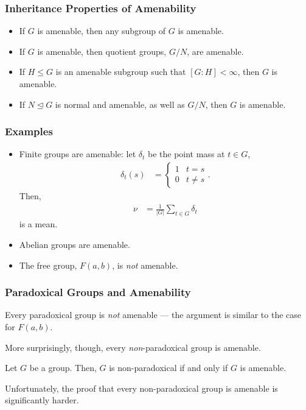\documentclass{beamer-custom}
\begin{document}
\begin{frame}
  \frametitle{Inheritance Properties of Amenability}
  \begin{itemize}
    \item If $G$ is amenable, then any subgroup of $G$ is amenable.
    \item If $G$ is amenable, then quotient groups, $G/N$, are amenable.
    \item If $H\leq G$ is an amenable subgroup such that $\left[ G:H \right] < \infty$, then $G$ is amenable.
    \item If $N\trianglelefteq G$ is normal and amenable, as well as $G/N$, then $G$ is amenable.
  \end{itemize}
\end{frame}
\begin{frame}
  \frametitle{Examples}
  \begin{itemize}
    \item Finite groups are amenable: let $\delta_t$ be the point mass at $t\in G$,
      \begin{align*}
        \delta_t(s) &= \begin{cases}
          1 & t = s\\
          0 & t\neq s
        \end{cases}.
      \end{align*}
      Then,
      \begin{align*}
        \nu &= \frac{1}{\left\vert G \right\vert} \sum_{t\in G}\delta_t
      \end{align*}
      is a mean.
    \item Abelian groups are amenable.
    \item The free group, $F(a,b)$, is \textit{not} amenable.
  \end{itemize}
\end{frame}
\begin{frame}
  \frametitle{Paradoxical Groups and Amenability}
  Every paradoxical group is \textit{not} amenable --- the argument is similar to the case for $F(a,b)$.\pause\newline

  More surprisingly, though, every \textit{non}-paradoxical group is amenable.\pause
  \begin{theorem}
    Let $G$ be a group. Then, $G$ is non-paradoxical if and only if $G$ is amenable.
  \end{theorem}\pause
  Unfortunately, the proof that every non-paradoxical group is amenable is significantly harder.
\end{frame}
\end{document}
